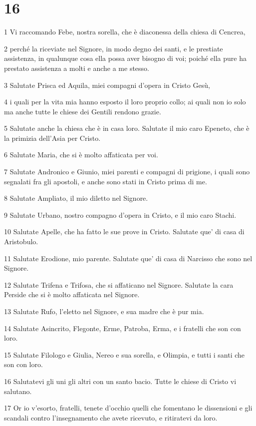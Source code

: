 \chapter{16}

\par 1 Vi raccomando Febe, nostra sorella, che è diaconessa della chiesa di Cencrea,
\par 2 perché la riceviate nel Signore, in modo degno dei santi, e le prestiate assistenza, in qualunque cosa ella possa aver bisogno di voi; poiché ella pure ha prestato assistenza a molti e anche a me stesso.
\par 3 Salutate Prisca ed Aquila, miei compagni d'opera in Cristo Gesù,
\par 4 i quali per la vita mia hanno esposto il loro proprio collo; ai quali non io solo ma anche tutte le chiese dei Gentili rendono grazie.
\par 5 Salutate anche la chiesa che è in casa loro. Salutate il mio caro Epeneto, che è la primizia dell'Asia per Cristo.
\par 6 Salutate Maria, che si è molto affaticata per voi.
\par 7 Salutate Andronico e Giunio, miei parenti e compagni di prigione, i quali sono segnalati fra gli apostoli, e anche sono stati in Cristo prima di me.
\par 8 Salutate Ampliato, il mio diletto nel Signore.
\par 9 Salutate Urbano, nostro compagno d'opera in Cristo, e il mio caro Stachi.
\par 10 Salutate Apelle, che ha fatto le sue prove in Cristo. Salutate que' di casa di Aristobulo.
\par 11 Salutate Erodione, mio parente. Salutate que' di casa di Narcisso che sono nel Signore.
\par 12 Salutate Trifena e Trifosa, che si affaticano nel Signore. Salutate la cara Perside che si è molto affaticata nel Signore.
\par 13 Salutate Rufo, l'eletto nel Signore, e sua madre che è pur mia.
\par 14 Salutate Asincrito, Flegonte, Erme, Patroba, Erma, e i fratelli che son con loro.
\par 15 Salutate Filologo e Giulia, Nereo e sua sorella, e Olimpia, e tutti i santi che son con loro.
\par 16 Salutatevi gli uni gli altri con un santo bacio. Tutte le chiese di Cristo vi salutano.
\par 17 Or io v'esorto, fratelli, tenete d'occhio quelli che fomentano le dissensioni e gli scandali contro l'insegnamento che avete ricevuto, e ritiratevi da loro.

